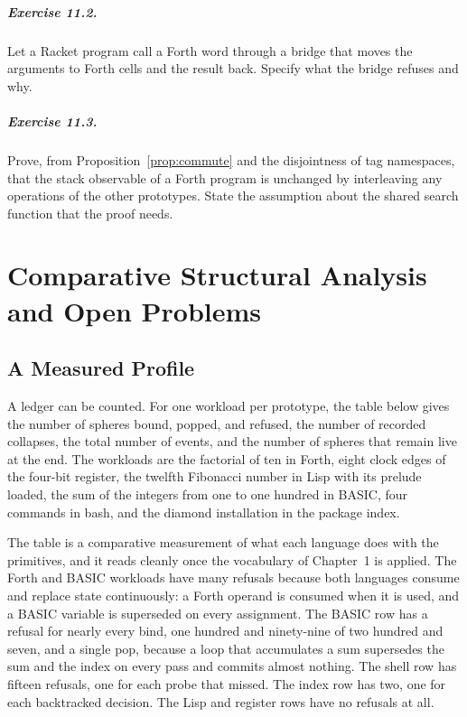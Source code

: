 \documentclass[11pt,oneside]{report}
\theoremstyle{plain}
\theoremstyle{definition}
\theoremstyle{remark}
\begin{document}
\paragraph{Exercise 11.2.} Let a Racket program call a Forth word through a bridge that moves the arguments to Forth cells and the result back. Specify what the bridge refuses and why.

\paragraph{Exercise 11.3.} Prove, from Proposition~\ref{prop:commute} and the disjointness of tag namespaces, that the stack observable of a Forth program is unchanged by interleaving any operations of the other prototypes. State the assumption about the shared search function that the proof needs.

\chapter{Comparative Structural Analysis and Open Problems}

\section{A Measured Profile}

A ledger can be counted. For one workload per prototype, the table below gives the number of spheres bound, popped, and refused, the number of recorded collapses, the total number of events, and the number of spheres that remain live at the end. The workloads are the factorial of ten in Forth, eight clock edges of the four-bit register, the twelfth Fibonacci number in Lisp with its prelude loaded, the sum of the integers from one to one hundred in BASIC, four commands in bash, and the diamond installation in the package index.

\begin{table}[H]
\centering

\caption{Event counts and live spheres at the end of one workload per prototype.}
\end{table}

The table is a comparative measurement of what each language does with the primitives, and it reads cleanly once the vocabulary of Chapter~1 is applied. The Forth and BASIC workloads have many refusals because both languages consume and replace state continuously: a Forth operand is consumed when it is used, and a BASIC variable is superseded on every assignment. The BASIC row has a refusal for nearly every bind, one hundred and ninety-nine of two hundred and seven, and a single pop, because a loop that accumulates a sum supersedes the sum and the index on every pass and commits almost nothing. The shell row has fifteen refusals, one for each probe that missed. The index row has two, one for each backtracked decision. The Lisp and register rows have no refusals at all.
\end{document}
